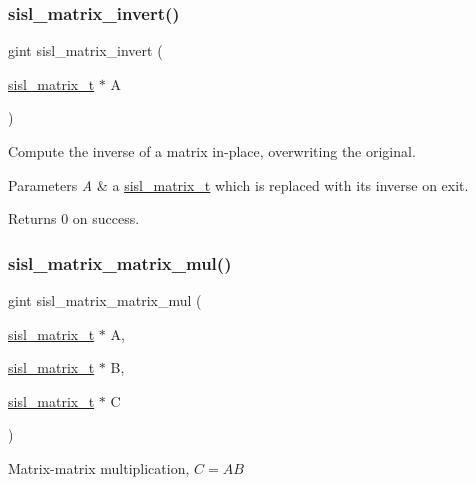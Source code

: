 \subsubsection{\texorpdfstring{sisl\+\_\+matrix\+\_\+invert()}{sisl\_matrix\_invert()}}
{\footnotesize\ttfamily gint sisl\+\_\+matrix\+\_\+invert (\begin{DoxyParamCaption}\item[{\mbox{\hyperlink{group__matrix_gad147923587b355644defb9bfbf981740}{sisl\+\_\+matrix\+\_\+t}} $\ast$}]{A }\end{DoxyParamCaption})}

Compute the inverse of a matrix in-\/place, overwriting the original.


\begin{DoxyParams}{Parameters}
{\em A} & a \mbox{\hyperlink{group__matrix_gad147923587b355644defb9bfbf981740}{sisl\+\_\+matrix\+\_\+t}} which is replaced with its inverse on exit.\\
\hline
\end{DoxyParams}
\begin{DoxyReturn}{Returns}
0 on success. 
\end{DoxyReturn}
\mbox{\label{group__matrix_ga4eba2be7655e4f1b1845709f27994445}} 
\subsubsection{\texorpdfstring{sisl\+\_\+matrix\+\_\+matrix\+\_\+mul()}{sisl\_matrix\_matrix\_mul()}}
{\footnotesize\ttfamily gint sisl\+\_\+matrix\+\_\+matrix\+\_\+mul (\begin{DoxyParamCaption}\item[{\mbox{\hyperlink{group__matrix_gad147923587b355644defb9bfbf981740}{sisl\+\_\+matrix\+\_\+t}} $\ast$}]{A,  }\item[{\mbox{\hyperlink{group__matrix_gad147923587b355644defb9bfbf981740}{sisl\+\_\+matrix\+\_\+t}} $\ast$}]{B,  }\item[{\mbox{\hyperlink{group__matrix_gad147923587b355644defb9bfbf981740}{sisl\+\_\+matrix\+\_\+t}} $\ast$}]{C }\end{DoxyParamCaption})}

Matrix-\/matrix multiplication, $C=AB$


